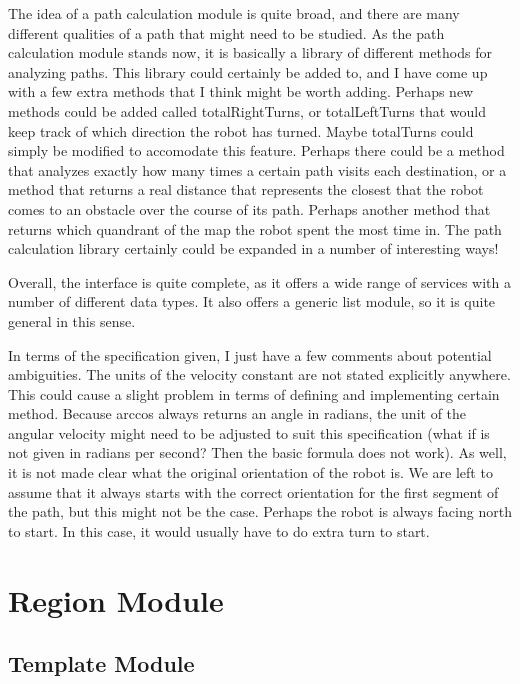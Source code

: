 \documentclass[12pt]{article}
\begin{document}
The idea of a path calculation module is quite broad, and there are many different qualities of a path that might need to be studied. As the path calculation module stands now, it is basically a library of different methods for analyzing paths. This library could certainly be added to, and I have come up with a few extra methods that I think might be worth adding. Perhaps new methods could be added called totalRightTurns, or totalLeftTurns that would keep track of which direction the robot has turned. Maybe totalTurns could simply be modified to accomodate this feature. Perhaps there could be a method that analyzes exactly how many times a certain path visits each destination, or a method that returns a real distance that represents the closest that the robot comes to an obstacle over the course of its path. Perhaps another method that returns which quandrant of the map the robot spent the most time in. The path calculation library certainly could be expanded in a number of interesting ways!

Overall, the interface is quite complete, as it offers a wide range of services with a number of different data types. It also offers a generic list module, so it is quite general in this sense. 

In terms of the specification given, I just have a few comments about potential ambiguities. The units of the velocity constant are not stated explicitly anywhere. This could cause a slight problem in terms of defining and implementing certain method. Because arccos always returns an angle in radians, the unit of the angular velocity might need to be adjusted to suit this specification (what if is not given in radians per second? Then the basic formula does not work). As well, it is not made clear what the original orientation of the robot is. We are left to assume that it always starts with the correct orientation for the first segment of the path, but this might not be the case. Perhaps the robot is always facing north to start. In this case, it would usually have to do extra turn to start. 

\newpage

\section* {Region Module}

\subsection* {Template Module}
\end{document}
